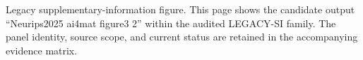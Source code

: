 Legacy supplementary-information figure. This page shows the candidate output ``Neurips2025 ai4mat figure3 2'' within the audited LEGACY-SI family. The panel identity, source scope, and current status are retained in the accompanying evidence matrix.
